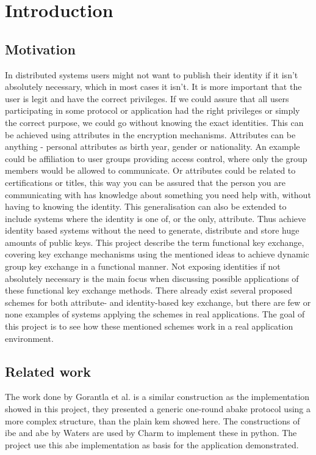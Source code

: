 \chapter{Introduction}
\label{chp:intro} 
\section{Motivation}
In distributed systems users might not want to publish their identity if it isn't absolutely necessary, which in most cases it isn't. It is more important that the user is legit and have the correct privileges. If we could assure that all users participating in some protocol or application had the right privileges or simply the correct purpose, we could go without knowing the exact identities. This can be achieved using attributes in the encryption mechanisms. Attributes can be anything - personal attributes as birth year, gender or nationality. An example could be affiliation to user groups providing access control, where only the group members would be allowed to communicate. Or attributes could be related to certifications or titles, this way you can be assured that the person you are communicating with has knowledge about something you need help with, without having to knowing the identity. This generalisation can also be extended to include systems where the identity is one of, or the only, attribute. Thus achieve identity based systems without the need to generate, distribute and store huge amounts of public keys. This project describe the term functional key exchange, covering key exchange mechanisms using the mentioned ideas to achieve dynamic group key exchange in a functional manner. Not exposing identities if not absolutely necessary is the main focus when discussing possible applications of these functional key exchange methods. There already exist several proposed schemes for both attribute- and identity-based key exchange, but there are few or none examples of systems applying the schemes in real applications. The goal of this project is to see how these mentioned schemes work in a real application environment.

\section{Related work}\label{sec:related_work}
The work done by Gorantla et al.\cite{gorantla2010attribute} is a similar construction as the implementation showed in this project, they presented a generic one-round \gls{abake} protocol using a more complex structure, than the plain \gls{kem} showed here. The constructions of \gls{ibe} and \gls{abe} by Waters\cite{ibe_waters09, abe_waters09} are used by Charm\cite{DBLP:Charm13} to implement these in python. The project use this \gls{abe} implementation as basis for the application demonstrated. 

